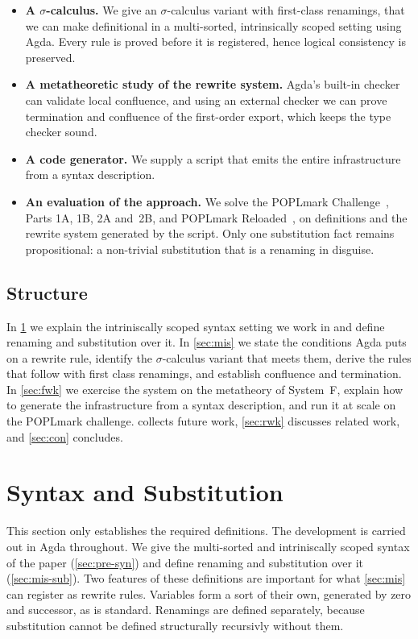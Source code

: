 \documentclass[sigplan,anonymous,review]{acmart}
\theoremstyle{acmdefinition}
\begin{document}
\begin{itemize}
  \item \textbf{A $\sigma$-calculus.}
        We give an $σ$-calculus variant with first-class renamings, that we can make definitional in a
        multi-sorted, intrinsically scoped setting using Agda. Every rule is proved before it is
        registered, hence logical consistency is preserved.
  \item \textbf{A metatheoretic study of the rewrite system.}
        Agda's built-in checker can validate local confluence,
        and using an external checker we can prove termination and confluence of the
        first-order export, which keeps the type checker sound.
  \item \textbf{A code generator.}
        We supply a script that emits the entire infrastructure from a syntax description.
  \item \textbf{An evaluation of the approach.}
        We solve the POPLmark Challenge~\cite{poplmark2005}, Parts 1A, 1B, 2A and~2B, and POPLmark Reloaded~\cite{poplmarkreloaded2019},
        on definitions and the rewrite system generated by the script. Only one
        substitution fact remains propositional: a non-trivial substitution that is a renaming in disguise.
\end{itemize}

\subsection*{Structure}

In \cref{sec:pre} we explain the intriniscally scoped syntax setting we work in
and define renaming and substitution over it. In \cref{sec:mis} we state the
conditions Agda puts on a rewrite rule, identify the $σ$-calculus variant that
meets them, derive the rules that follow with first class renamings, and
establish confluence and termination. In \cref{sec:fwk} we exercise the system
on the metatheory of System~F, explain how to generate the infrastructure from
a syntax description, and run it at scale on the POPLmark challenge.
 collects future work, \cref{sec:rwk} discusses related work,
and \cref{sec:con} concludes.

\section{Syntax and Substitution}\label{sec:pre}

This section only establishes the required definitions. The development is
carried out in Agda throughout. We give the multi-sorted and intriniscally
scoped syntax of the paper (\cref{sec:pre-syn}) and define renaming and
substitution over it (\cref{sec:mis-sub}). Two features of these definitions
are important for what \cref{sec:mis} can register as rewrite rules. Variables
form a sort of their own, generated by zero and successor, as is standard.
Renamings are defined separately, because substitution cannot be defined
structurally recursivly without them.
\end{document}
